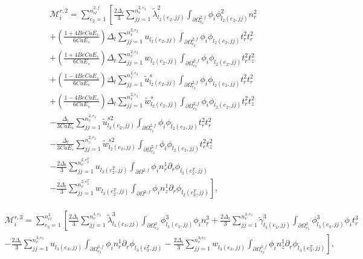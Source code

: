 \documentclass{article}
\begin{document}
\begin{equation}
\begin{array}{l} \mathcal{M}_i^{r,2} = \sum_{e_2=1}^{n_{el}^{2,f}} \left[ \frac{2\Delta_t}{3} \sum_{jj=1}^{n_v^{2,e_2}} \tilde{\lambda}_{l_2(e_2,jj)}^2 \int_{\partial \Omega_{e_2}^{2,f}} \phi_i \phi_{l_2(e_2,jj)}^2 n_r^2 \right. \\ + \left( \frac{1 + 4Be Ca E_s}{6Ca E_s} \right) \Delta_t \sum_{jj=1}^{n_v^{2,e_2}} u_{l_2(e_2,jj)} \int_{\partial \Omega_{e_2}^{2,f}} \phi_i \phi_{l_2(e_2,jj)} t_r^2 t_r^2 \\ + \left( \frac{1 + 4Be Ca E_s}{6Ca E_s} \right) \Delta_t \sum_{jj=1}^{n_v^{2,e_2}} w_{l_2(e_2,jj)} \int_{\partial \Omega_{e_2}^{2,f}} \phi_i \phi_{l_2(e_2,jj)} t_r^2 t_z^2 \\ + \left( \frac{1 - 4Be Ca E_s}{6Ca E_s} \right) \Delta_t \sum_{jj=1}^{n_v^{2,e_2}} \tilde{u}_{l_2(e_2,jj)}^s \int_{\partial \Omega_{e_2}^{2,f}} \phi_i \phi_{l_2(e_2,jj)} t_r^2 t_r^2 \\ + \left( \frac{1 - 4Be Ca E_s}{6Ca E_s} \right) \Delta_t \sum_{jj=1}^{n_v^{2,e_2}} \tilde{w}_{l_2(e_2,jj)}^s \int_{\partial \Omega_{e_2}^{2,f}} \phi_i \phi_{l_2(e_2,jj)} t_r^2 t_z^2 \\ - \frac{\Delta_t}{3Ca E_s} \sum_{jj=1}^{n_v^{2,e_2}} \tilde{u}_{l_2(e_2,jj)}^{s2} \int_{\partial \Omega_{e_2}^{2,f}} \phi_i \phi_{l_2(e_2,jj)} t_r^2 t_r^2 \\ - \frac{\Delta_t}{3Ca E_s} \sum_{jj=1}^{n_v^{2,e_2}} \tilde{w}_{l_2(e_2,jj)}^{s2} \int_{\partial \Omega_{e_2}^{2,f}} \phi_i \phi_{l_2(e_2,jj)} t_r^2 t_z^2 \\ - \frac{2\Delta_t}{3} \sum_{jj=1}^{n_v^{2,e_2^T}} u_{l_2(e_2^T,jj)} \int_{\partial \Omega^{2,f}} \phi_i n_r^1 \partial_r \phi_{l_2(e_2^T,jj)} \\ \left. - \frac{2\Delta_t}{3} \sum_{jj=1}^{n_v^{2,e_2^T}} w_{l_2(e_2^T,jj)} \int_{\partial \Omega^{2,f}} \phi_i n_z^1 \partial_r \phi_{l_2(e_2^T,jj)} \right], \end{array} \tag{4.119}
\end{equation}

\begin{equation}
\begin{array}{l} \mathcal{M}_i^{r,3} = \sum_{e_3=1}^{n_{el}^{3}} \left[ \frac{2\Delta_t}{3} \sum_{jj=1}^{n_v^{3,e_3}} \tilde{\lambda}_{l_3(e_3,jj)}^3 \int_{\partial \Omega_{e_3}^{3}} \phi_{l_3(e_3,jj)}^3 \phi_i n_r^3 + \frac{2\Delta_t}{3} \sum_{jj=1}^{n_v^{3,e_3}} \tilde{\gamma}_{l_3(e_3,jj)}^3 \int_{\partial \Omega_{e_3}^{3}} \phi_{l_3(e_3,jj)}^3 \phi_i t_r^3 \right. \\ \left. - \frac{2\Delta_t}{3} \sum_{jj=1}^{n_v^{3,e_3}} u_{l_3(e_3,jj)} \int_{\partial \Omega_{e_3}^{3,f}} \phi_i n_r^1 \partial_r \phi_{l_3(e_3^T,jj)} - \frac{2\Delta_t}{3} \sum_{jj=1}^{n_v^{3,e_3}} w_{l_3(e_3,jj)} \int_{\partial \Omega_{e_3}^{3,f}} \phi_i n_z^1 \partial_r \phi_{l_3(e_3^T,jj)} \right], \end{array} \tag{4.120}
\end{equation}
\end{document}
